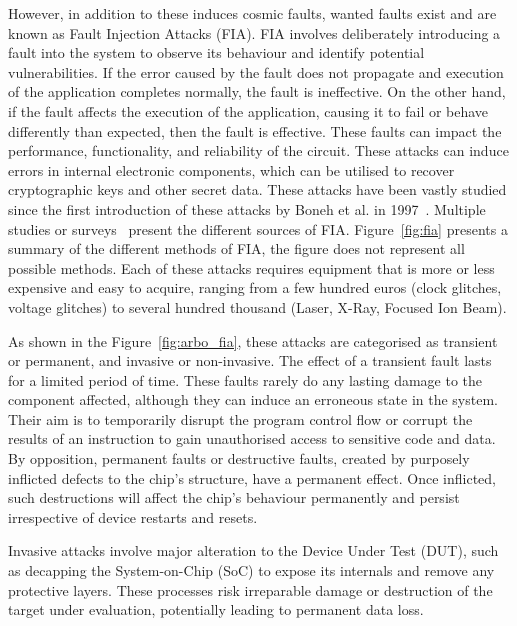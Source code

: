 However, in addition to these induces cosmic faults, wanted faults exist and are known as Fault Injection Attacks (FIA). FIA involves deliberately introducing a fault into the system to observe its behaviour and identify potential vulnerabilities. If the error caused by the fault does not propagate and execution of the application completes normally, the fault is ineffective. On the other hand, if the fault affects the execution of the application, causing it to fail or behave differently than expected, then the fault is effective. These faults can impact the performance, functionality, and reliability of the circuit. These attacks can induce errors in internal electronic components, which can be utilised to recover cryptographic keys and other secret data.
These attacks have been vastly studied since the first introduction of these attacks by Boneh et al. in 1997~\cite{BDL-97-eurocrypt,BDL-01-crypto}. Multiple studies or surveys~\cite{ZAV-06-jarab, BCNTW-06-procieee, CKNDCTD-21-compsec, PBR-15-dtis, YSW-18-hss, BH-22-access} present the different sources of FIA.
Figure~\ref{fig:fia} presents a summary of the different methods of FIA, the figure does not represent all possible methods. Each of these attacks requires equipment that is more or less expensive and easy to acquire, ranging from a few hundred euros (clock glitches, voltage glitches) to several hundred thousand (Laser, X-Ray, Focused Ion Beam).

As shown in the Figure~\ref{fig:arbo_fia}, these attacks are categorised as transient or permanent, and invasive or non-invasive.
The effect of a transient fault lasts for a limited period of time. These faults rarely do any lasting damage to the component affected, although they can induce an erroneous state in the system. Their aim is to temporarily disrupt the program control flow or corrupt the results of an instruction to gain unauthorised access to sensitive code and data.
By opposition, permanent faults or destructive faults, created by purposely inflicted defects to the chip’s structure, have a permanent effect. Once inflicted, such destructions will affect the chip’s behaviour permanently and persist irrespective of device restarts and resets.

Invasive attacks involve major alteration to the Device Under Test (DUT), such as decapping the System-on-Chip (SoC) to expose its internals and remove any protective layers. These processes risk irreparable damage or destruction of the target under evaluation, potentially leading to permanent data loss.

